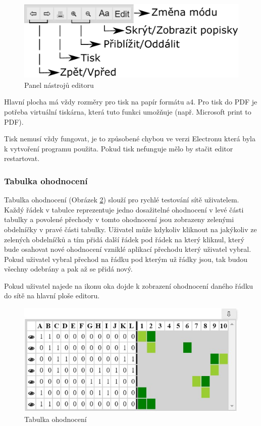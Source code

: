 \documentclass[
  biblatex,
  glossaries,
  printversion
]{kidiplom}
\begin{document}
\begin{figure}[h]
  \centering
  \includegraphics[width=\linewidth]{bar}
  \caption{Panel nástrojů editoru}\label{fig:Panel nástrojů editoru}
\end{figure}

\label{tisk}

Hlavní plocha má vždy rozměry pro tisk na papír formátu a4. Pro tisk 
do PDF je potřeba virtuální tiskárna, která tuto funkci umožňuje (např. Microsoft print to PDF).

Tisk nemusí vždy fungovat, je to způsobené chybou ve verzi Electronu 
která byla k vytvoření programu použita. Pokud tisk 
nefunguje mělo by stačit editor restartovat.

\subsubsection{Tabulka ohodnocení}\label{tabulka ohodnocení}

Tabulka ohodnocení (Obrázek \ref{fig:Tabulka ohodnocení obrázek}) slouží pro rychlé testování sítě uživatelem.
Každý řádek v tabulce reprezentuje jedno dosažitelné ohodnocení 
v levé části tabulky a povolené přechody v tomto ohodnocení jsou 
zobrazeny zelenými obdelníčky v pravé části tabulky.
Uživatel může kdykoliv kliknout na jakýkoliv ze zelených obdelníčků 
a tím přidá další řádek pod řádek na který kliknul, který bude osahovat 
nové ohodnocení vzniklé aplikací přechodu který uživatel vybral.
Pokud uživatel vybral přechod na řádku pod kterým už řádky jsou, 
tak budou všechny odebrány a pak až se přidá nový.

Pokud uživatel najede na ikonu oka dojde k zobrazení ohodnocení 
daného řádku do sítě na hlavní ploše editoru.

\begin{figure}[h]
  \centering
  \includegraphics[width=\linewidth]{tabulka}
  \caption{Tabulka ohodnocení}\label{fig:Tabulka ohodnocení obrázek}
\end{figure}
\end{document}
